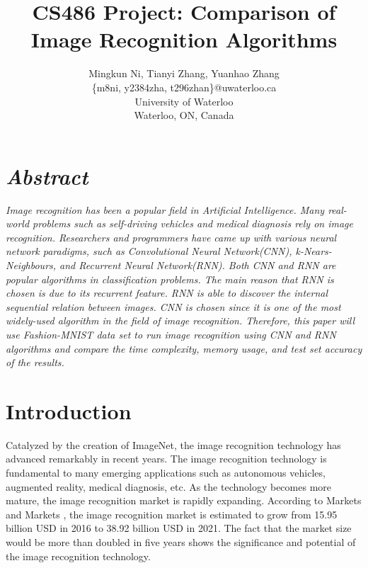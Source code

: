 \documentclass[letterpaper]{article} %
\begin{document}
%
\title{CS486 Project: Comparison of Image Recognition Algorithms}
\author{Mingkun Ni, Tianyi Zhang, Yuanhao Zhang\\
\{m8ni, y2384zha, t296zhan\}@uwaterloo.ca\\
University of Waterloo\\
Waterloo, ON, Canada\\
}
\maketitle


\section{\em{Abstract}}
\textit{Image recognition has been a popular field in Artificial Intelligence. Many real-world problems such as self-driving vehicles and medical diagnosis rely on image recognition. Researchers and programmers have came up with various neural network paradigms, such as Convolutional Neural Network(CNN), k-Nears-Neighbours, and Recurrent Neural Network(RNN). Both CNN and RNN are popular algorithms in classification problems. The main reason that RNN is chosen is due to its recurrent feature. RNN is able to discover the internal sequential relation between images. CNN is chosen since it is one of the most widely-used algorithm in the field of image recognition. Therefore, this paper will use Fashion-MNIST data set to run image recognition using CNN and RNN algorithms and compare the time complexity, memory usage, and test set accuracy of the results.}


\section{Introduction}
Catalyzed by the creation of ImageNet, the image recognition technology has advanced remarkably in recent years. The image recognition technology is fundamental to many emerging applications such as autonomous vehicles, augmented reality, medical diagnosis, etc. As the technology becomes more mature, the image recognition market is rapidly expanding. According to Markets and Markets \cite{market}, the image recognition market is estimated to grow from 15.95 billion USD in 2016 to 38.92 billion USD in 2021. The fact that the market size would be more than doubled in five years shows the significance and potential of the image recognition technology.
\end{document}
